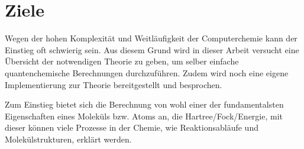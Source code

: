 \section{Ziele}
Wegen der hohen Komplexität und Weitläufigkeit der Computerchemie
kann der Einstieg oft schwierig sein. Aus diesem Grund wird
in dieser Arbeit versucht eine Übersicht der notwendigen Theorie zu geben,
um selber einfache quantenchemische Berechnungen durchzuführen.
Zudem wird noch eine eigene Implementierung
zur Theorie bereitgestellt und besprochen.

Zum Einstieg bietet sich die Berechnung von wohl einer der fundamentalsten Eigenschaften 
eines Moleküls bzw. Atoms an, die Hartree\-/Fock\-/Energie, 
mit dieser können viele Prozesse in der Chemie,
wie Reaktionsabläufe und Molekülstrukturen, erklärt werden.